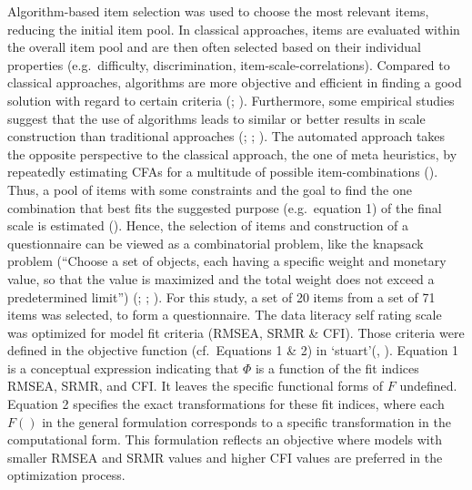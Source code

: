 \documentclass[
  12pt,
  a4paper,
  twoside]{article}
\begin{document}
Algorithm-based item selection was used to choose the most relevant items, reducing the initial item pool. In classical approaches, items are evaluated within the overall item pool and are then often selected based on their individual properties (e.g.~difficulty, discrimination, item-scale-correlations).
Compared to classical approaches, algorithms are more objective and efficient in finding a good solution with regard to certain criteria (; ). Furthermore, some empirical studies suggest that the use of algorithms leads to similar or better results in scale construction than traditional approaches (; ; ). The automated approach takes the opposite perspective to the classical approach, the one of meta heuristics, by repeatedly estimating CFAs for a multitude of possible item-combinations (). Thus, a pool of items with some constraints and the goal to find the one combination that best fits the suggested purpose (e.g.~equation 1) of the final scale is estimated (). Hence, the selection of items and construction of a questionnaire can be viewed as a combinatorial problem, like the knapsack problem (``Choose a set of objects, each having a specific weight and monetary value, so that the value is maximized and the total weight does not exceed a predetermined limit'') (; ; ).
For this study, a set of 20 items from a set of 71 items was selected, to form a questionnaire. The data literacy self rating scale was optimized for model fit criteria (RMSEA, SRMR \& CFI). Those criteria were defined in the objective function (cf.~Equations 1 \& 2) in `stuart'(, ). Equation 1 is a conceptual expression indicating that \(\Phi\) is a function of the fit indices RMSEA, SRMR, and CFI. It leaves the specific functional forms of \(F\) undefined. Equation 2 specifies the exact transformations for these fit indices, where each \(F()\) in the general formulation corresponds to a specific transformation in the computational form. This formulation reflects an objective where models with smaller RMSEA and SRMR values and higher CFI values are preferred in the optimization process.
\end{document}
